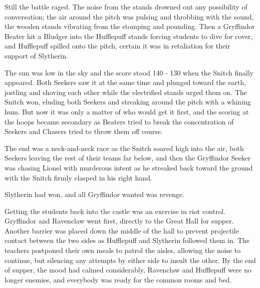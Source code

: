 Still the battle raged. The noise from the stands drowned out any possibility of conversation; the air around the pitch was pulsing and throbbing with the sound, the wooden stands vibrating from the stomping and pounding. Then a Gryffindor Beater hit a Bludger into the Hufflepuff stands forcing students to dive for cover, and Hufflepuff spilled onto the pitch, certain it was in retaliation for their support of Slytherin.

The sun was low in the sky and the score stood 140 - 130 when the Snitch finally appeared. Both Seekers saw it at the same time and plunged toward the earth, jostling and shoving each other while the electrified stands urged them on. The Snitch won, eluding both Seekers and streaking around the pitch with a whining hum. But now it was only a matter of who would get it first, and the scoring at the hoops became secondary as Beaters tried to break the concentration of Seekers and Chasers tried to throw them off course.

The end was a neck-and-neck race as the Snitch soared high into the air, both Seekers leaving the rest of their teams far below, and then the Gryffindor Seeker was chasing Lionel with murderous intent as he streaked back toward the ground with the Snitch firmly clasped in his right hand.

Slytherin had won, and all Gryffindor wanted was revenge.

Getting the students back into the castle was an exercise in riot control. Gryffindor and Ravenclaw went first, directly to the Great Hall for supper. Another barrier was placed down the middle of the hall to prevent projectile contact between the two sides as Hufflepuff and Slytherin followed them in. The teachers postponed their own meals to patrol the aisles, allowing the noise to continue, but silencing any attempts by either side to insult the other. By the end of supper, the mood had calmed considerably, Ravenclaw and Hufflepuff were no longer enemies, and everybody was ready for the common rooms and bed. 


